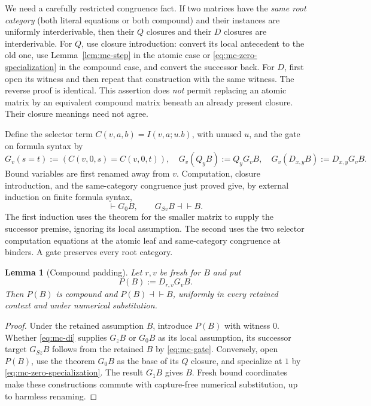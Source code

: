 \documentclass[11pt,letterpaper]{article}
\newtheorem{lemma}[theorem]{Lemma}
\theoremstyle{definition}
\theoremstyle{remark}
\begin{document}
We need a carefully restricted congruence fact.  If two matrices have
the \emph{same root category} (both literal equations or both compound)
and their instances are uniformly interderivable, then their $Q$
closures and their $D$ closures are interderivable.  For $Q$, use
closure introduction: convert its local antecedent to the old one,
use Lemma~\ref{lem:mc-step} in the atomic case or
\eqref{eq:mc-zero-specialization} in the compound case, and convert
the successor back.  For $D$, first open its witness and then repeat
that construction with the same witness.  The reverse proof is identical.
This assertion does \emph{not} permit replacing an atomic matrix by
an equivalent compound matrix beneath an already present closure.
Their closure meanings need not agree.

Define the selector term $C(v,a,b)=I(v,a;u.b)$, with unused $u$,
and the gate on formula syntax by
\[
 G_v(s=t):=(C(v,0,s)=C(v,0,t)),\quad
 G_v(Q_yB):=Q_yG_vB,\quad
 G_v(D_{x,y}B):=D_{x,y}G_vB.
\]
Bound variables are first renamed away from $v$.  Computation,
closure introduction, and the same-category congruence just proved
give, by external induction on finite formula syntax,
\[
 \vdash G_0B,\qquad G_{Sv}B\dashv\vdash B.
 \tag{MC8}\label{eq:mc-gate}
\]
The first induction uses the theorem for the smaller matrix to supply
the successor premise, ignoring its local assumption.  The second
uses the two selector computation equations at the atomic leaf and
same-category congruence at binders.  A gate preserves every root category.

\begin{lemma}[Compound padding]
\label{lem:mc-padding}
Let $r,v$ be fresh for $B$ and put
\[
                 P(B):=D_{r,v}G_vB.
\]
Then $P(B)$ is compound and $P(B)\dashv\vdash B$, uniformly in
every retained context and under numerical substitution.
\end{lemma}
\begin{proof}
Under the retained assumption $B$, introduce $P(B)$ with witness $0$.
Whether \eqref{eq:mc-di} supplies $G_zB$ or $G_0B$ as its local
assumption, its successor target $G_{Sz}B$ follows from the retained
$B$ by \eqref{eq:mc-gate}.  Conversely, open $P(B)$, use the theorem
$G_0B$ as the base of its $Q$ closure, and specialize at $1$ by
\eqref{eq:mc-zero-specialization}.  The result $G_1B$ gives $B$.
Fresh bound coordinates make these constructions commute with
capture-free numerical substitution, up to harmless renaming.
\end{proof}
\end{document}
